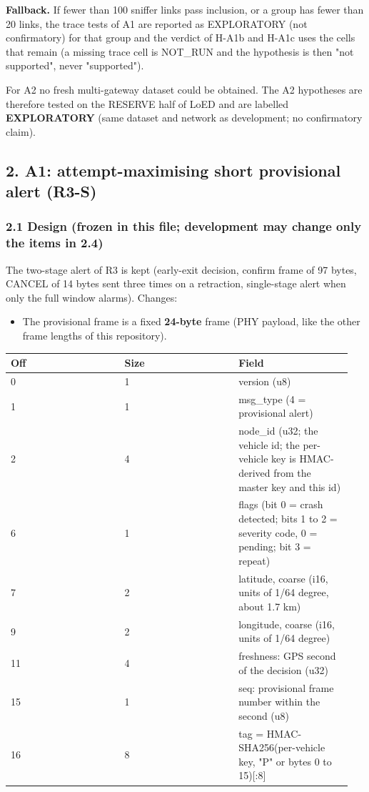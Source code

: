 \textbf{Fallback.} If fewer than 100 sniffer links pass inclusion, or a group has fewer than 20 links, the trace tests of A1 are reported as EXPLORATORY (not confirmatory) for that group and the verdict of H-A1b and H-A1c uses the cells that remain (a missing trace cell is NOT\_RUN and the hypothesis is then "not supported", never "supported").

For A2 no fresh multi-gateway dataset could be obtained. The A2 hypotheses are therefore tested on the RESERVE half of LoED and are labelled \textbf{EXPLORATORY} (same dataset and network as development; no confirmatory claim).

\subsection*{2. A1: attempt-maximising short provisional alert (R3-S)}

\subsubsection*{2.1 Design (frozen in this file; development may change only the items in 2.4)}

The two-stage alert of R3 is kept (early-exit decision, confirm frame of 97 bytes, CANCEL of 14 bytes sent three times on a retraction, single-stage alert when only the full window alarms). Changes:

\begin{itemize}
\item The provisional frame is a fixed \textbf{24-byte} frame (PHY payload, like the other frame lengths of this repository).
\end{itemize}

{\scriptsize\raggedright
\begin{longtable}{p{0.317\linewidth}p{0.317\linewidth}p{0.317\linewidth}}
\toprule
Off & Size & Field \\
\midrule
\endhead
0 & 1 & version (u8) \\
1 & 1 & msg\_type (4 = provisional alert) \\
2 & 4 & node\_id (u32; the vehicle id; the per-vehicle key is HMAC-derived from the master key and this id) \\
6 & 1 & flags (bit 0 = crash detected; bits 1 to 2 = severity code, 0 = pending; bit 3 = repeat) \\
7 & 2 & latitude, coarse (i16, units of 1/64 degree, about 1.7 km) \\
9 & 2 & longitude, coarse (i16, units of 1/64 degree) \\
11 & 4 & freshness: GPS second of the decision (u32) \\
15 & 1 & seq: provisional frame number within the second (u8) \\
16 & 8 & tag = HMAC-SHA256(per-vehicle key, "P" or bytes 0 to 15)[:8] \\
\bottomrule
\end{longtable}}

